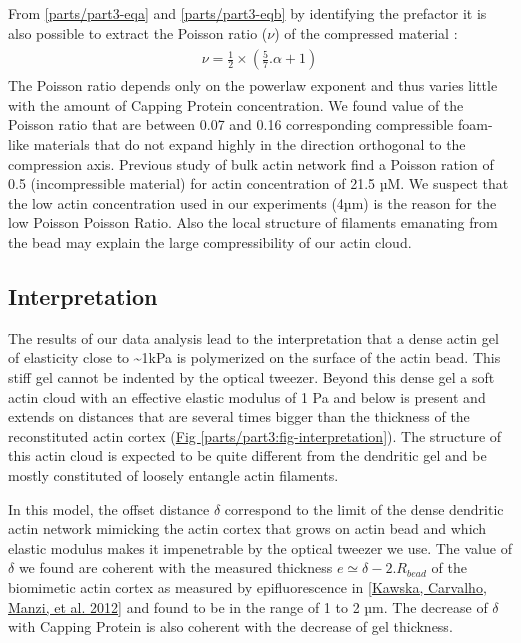 \documentclass[A4paperpaper,11pt,english]{sphinxmanual}
\begin{document}
From \eqref{parts/part3-eqa} and \eqref{parts/part3-eqb} by identifying the prefactor it is also possible
to extract the Poisson ratio (\(\nu\)) of the compressed material :
\label{parts/part3:equation-nu=f(alpha)}\begin{gather}
\begin{split}\nu =\frac 1 2 \times \left( \frac 5 7.\alpha +1\right)\end{split}\label{parts/part3-nu=f(alpha)}
\end{gather}
The Poisson ratio depends only on the powerlaw exponent and thus varies little
with the amount of Capping Protein concentration.  We found value of the
Poisson ratio that are between 0.07 and 0.16 corresponding compressible
foam-like materials that do not expand highly in the direction orthogonal to
the compression axis. Previous study of bulk actin network find a Poisson
ration of 0.5 (incompressible material) for actin concentration of 21.5 µM.  We
suspect that the low actin concentration used in our experiments (4µm) is the
reason for the low Poisson Poisson Ratio. Also the local structure of filaments
emanating from the  bead may explain the large compressibility of our actin
cloud.


\subsection{Interpretation}
\label{parts/part3:interpretation}
The results of our data analysis lead to the interpretation that
a dense actin gel of elasticity close to \textasciitilde{}1kPa is polymerized
on the surface of the actin bead. This stiff gel
cannot be indented by the optical tweezer. Beyond this dense gel a soft
actin cloud with an effective elastic modulus of 1 Pa and below is
present and extends on distances that are several times bigger than the thickness
of the reconstituted actin cortex (\hyperref[parts/part3:fig-interpretation]{Fig  \ref*{parts/part3:fig-interpretation}}). The
structure of this actin cloud is expected to be quite different from the
dendritic gel and be mostly constituted of loosely entangle actin filaments.

In this model, the offset distance \(\delta\) correspond to the limit of the dense
dendritic actin network mimicking the actin cortex that grows on actin bead
and which elastic modulus makes it impenetrable by the optical tweezer we use. The
value of \(\delta\) we found are coherent with the measured thickness \(e
\simeq \delta - 2.R_{bead}\) of the  biomimetic actin cortex as measured by
epifluorescence in {\hyperref[parts/part3:kawska2012]{{[}Kawska, Carvalho, Manzi,  et al.  2012{]}}} and found to be in the range of 1 to 2 µm. The decrease
of \(\delta\) with Capping Protein is also coherent with the decrease of gel
thickness.
\end{document}
